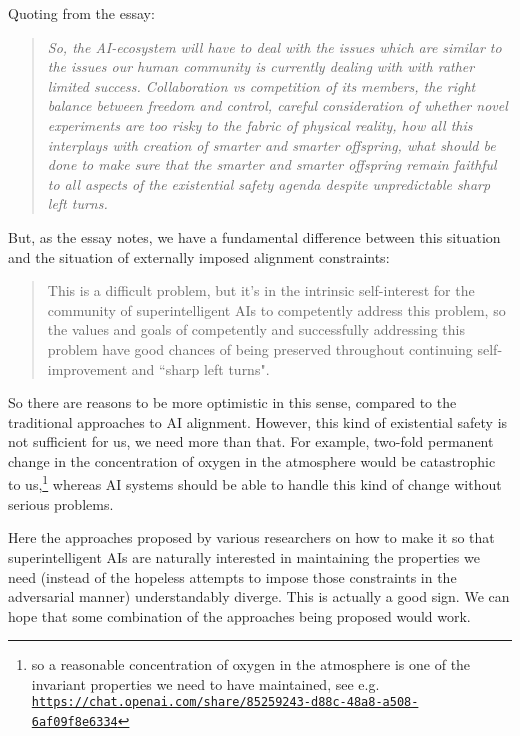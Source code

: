\documentclass{article}
\begin{document}
Quoting from the essay:

\begin{quote}
{\em\small So, the AI-ecosystem will have to deal with the issues which are similar to the issues our human community is currently dealing with with rather limited success. Collaboration vs competition of its members, the right balance between freedom and control, careful consideration of whether novel experiments are too risky to the fabric of physical reality, how all this interplays with creation of smarter and smarter offspring, what should be done to make sure that the smarter and smarter offspring remain faithful to all aspects of the existential safety agenda despite unpredictable sharp left turns.}
\end{quote}

But, as the essay notes, we have a fundamental difference between this situation and the situation of externally imposed
alignment constraints:

\begin{quote}
{\small This is a difficult problem, but it's in the intrinsic self-interest for the community of superintelligent AIs to competently address this problem, so the values and goals of competently and successfully addressing this problem have good chances of being preserved throughout continuing self-improvement and ``sharp left turns".}
\end{quote}

So there are reasons to be more optimistic in this sense, compared to the traditional approaches to AI alignment.
However, this kind of existential safety is not sufficient for us, we need more than that. For example, two-fold permanent change
in the concentration of oxygen in the atmosphere would be catastrophic to us,\footnote{so a reasonable
concentration of oxygen in the atmosphere is one of the invariant properties we need to have
maintained, see e.g.
\href{https://chat.openai.com/share/85259243-d88c-48a8-a508-6af09f8e6334}
{\tt https://chat.openai.com/share/85259243-d88c-48a8-a508-6af09f8e6334}} whereas AI systems should be able
to handle this kind of change without serious problems.

Here the approaches proposed by various researchers on how to make it so that superintelligent AIs are naturally
interested in maintaining the properties we need (instead of the hopeless attempts to
impose those constraints in the adversarial manner) understandably diverge. This is actually
a good sign. We can hope that some combination of the approaches being proposed would work.
\end{document}
